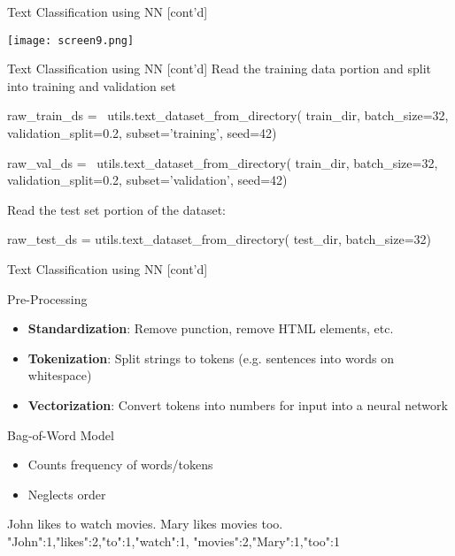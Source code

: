 \documentclass[ignorenonframetext,xcolor=x11names]{beamer}
\begin{document}
\begin{frame}[fragile]{Text Classification using NN \small [cont'd]}
\centering

\texttt{[image: screen9.png]}
\end{frame}

\begin{frame}[fragile]{Text Classification using NN \small [cont'd]}
Read the training data portion and split into training and validation set
\begin{pythoncode}
raw_train_ds = \
utils.text_dataset_from_directory(
    train_dir, batch_size=32,
    validation_split=0.2,
    subset='training', seed=42)
    
raw_val_ds = \
utils.text_dataset_from_directory(
    train_dir, batch_size=32,
    validation_split=0.2,
    subset='validation', seed=42)
\end{pythoncode}
Read the test set portion of the dataset:
\begin{pythoncode}
raw_test_ds = utils.text_dataset_from_directory(
    test_dir, batch_size=32)
\end{pythoncode}
\end{frame}

\begin{frame}[fragile]{Text Classification using NN \small [cont'd]}
\begin{block}{Pre-Processing}
\begin{itemize}
   \item \textbf{Standardization}: Remove punction, remove HTML elements, etc.
   \item \textbf{Tokenization}: Split strings to tokens (e.g. sentences into words on whitespace)
   \item \textbf{Vectorization}: Convert tokens into numbers for input into a neural network
\end{itemize}
\end{block}
\begin{block}{Bag-of-Word Model}
\begin{itemize}
   \item Counts frequency of words/tokens
   \item Neglects order
\end{itemize}
\begin{textcode}
John likes to watch movies. Mary likes movies too.
{"John":1,"likes":2,"to":1,"watch":1,
 "movies":2,"Mary":1,"too":1}
\end{textcode}
\end{block}
\end{frame}
\end{document}
